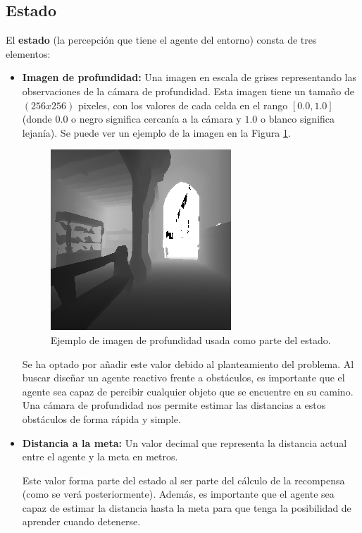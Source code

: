 \subsection{Estado}

El \textbf{estado} (la percepción que tiene el agente del entorno) consta de tres elementos:

\begin{itemize}
	\item \textbf{Imagen de profundidad:} Una imagen en escala de grises representando las observaciones de la cámara de profundidad. Esta imagen tiene un tamaño de $(256 x 256)$ pixeles, con los valores de cada celda en el rango $[0.0, 1.0]$ (donde $0.0$ o negro significa cercanía a la cámara y $1.0$ o blanco significa lejanía). Se puede ver un ejemplo de la imagen en la Figura \ref{fig:chap5-estado}.
	
\begin{figure}[h]
    \centering
    \includegraphics{imagenes/cap5/normalized.png}
    \caption{Ejemplo de imagen de profundidad usada como parte del estado.}
    \label{fig:chap5-estado}
\end{figure}			
			
	Se ha optado por añadir este valor debido al planteamiento del problema. Al buscar diseñar un agente reactivo frente a obstáculos, es importante que el agente sea capaz de percibir cualquier objeto que se encuentre en su camino. Una cámara de profundidad nos permite estimar las distancias a estos obstáculos de forma rápida y simple.	
	

	\item \textbf{Distancia a la meta:} Un valor decimal que representa la distancia actual entre el agente y la meta en metros.
	
	Este valor forma parte del estado al ser parte del cálculo de la recompensa (como se verá posteriormente). Además, es importante que el agente sea capaz de estimar la distancia hasta la meta para que tenga la posibilidad de aprender cuando detenerse.
	

\end{itemize}
